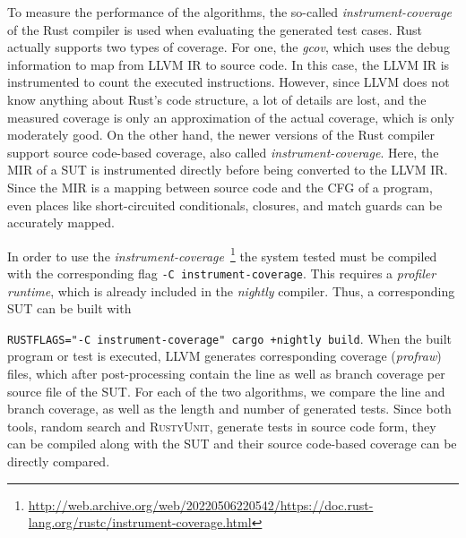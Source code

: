 \documentclass[paper=a4,%
  twoside,%
  BCOR4mm,%
  abstract=true,%
  toc=bibliography,%
  chapterprefix=true,%
  toc=bibliographynumbered,%
  open=right,%
  english,%
  pagesize=pdftex]{scrreprt}
\newcommand{\tech}{\textsc{RustyUnit}\xspace}
\newcommand{\mir}{\ac{MIR}\xspace}
\newcommand{\cfg}{\ac{CFG}\xspace}
\begin{document}

To measure the performance of the algorithms, the so-called \emph{instrument-coverage} of the Rust compiler is used when evaluating the generated test cases. Rust actually supports two types of coverage. For one, the \emph{gcov}, which uses the debug information to map from LLVM \ac{IR} to source code. In this case, the LLVM \ac{IR} is instrumented to count the executed instructions. However, since LLVM does not know anything about Rust's code structure, a lot of details are lost, and the measured coverage is only an approximation of the actual coverage, which is only moderately good. On the other hand, the newer versions of the Rust compiler support source code-based coverage, also called \emph{instrument-coverage}. Here, the \mir of a \ac{SUT} is instrumented directly before being converted to the LLVM \ac{IR}. Since the \mir is a mapping between source code and the \cfg of a program, even places like short-circuited conditionals, closures, and match guards can be accurately mapped.

In order to use the \emph{instrument-coverage}~\footnote{\url{http://web.archive.org/web/20220506220542/https://doc.rust-lang.org/rustc/instrument-coverage.html}} the system tested must be compiled with the corresponding flag \texttt{-C instrument-coverage}. This requires a \emph{profiler runtime}, which is already included in the \emph{nightly} compiler. Thus, a corresponding \ac{SUT} can be built with \raggedright\texttt{RUSTFLAGS="-C instrument-coverage" cargo +nightly build}. When the built program or test is executed, LLVM generates corresponding coverage (\emph{profraw}) files, which after post-processing contain the line as well as branch coverage per source file of the \ac{SUT}. For each of the two algorithms, we compare the line and branch coverage, as well as the length and number of generated tests. Since both tools, random search and \tech, generate tests in source code form, they can be compiled along with the \ac{SUT} and their source code-based coverage can be directly compared.
\end{document}
